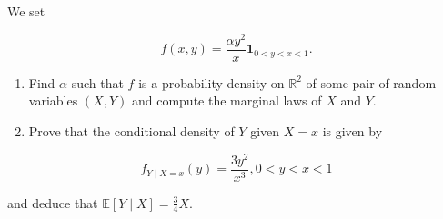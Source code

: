 \begin{Exercise}
  We set

  $$
    f(x, y)=\frac{\alpha y^{2}}{x} \mathbf{1}_{0<y<x<1} .
  $$

  \begin{enumerate}
    \item Find $\alpha$ such that $f$ is a probability density on $\mathbb{R}^{2}$ of some pair of random variables $(X, Y)$ and compute the marginal laws of $X$ and $Y$.

    \item Prove that the conditional density of $Y$ given $X=x$ is given by

  \end{enumerate}

  $$
    f_{Y \mid X=x}(y)=\frac{3 y^{2}}{x^{3}}, 0<y<x<1
  $$

  and deduce that $\mathbb{E}[Y \mid X]=\frac{3}{4} X$.
\end{Exercise}